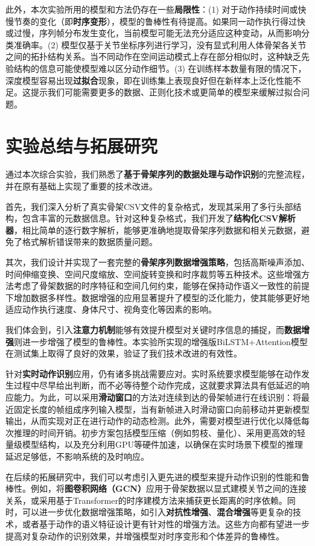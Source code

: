 \documentclass[UTF8]{article}
\begin{document}
此外，本次实验所用的模型和方法仍存在一些\textbf{局限性}：(1) 对于动作持续时间或快慢节奏的变化（即\textbf{时序变形}），模型的鲁棒性有待提高。如果同一动作执行得过快或过慢，序列帧分布发生变化，当前模型可能无法充分适应这种变动，从而影响分类准确率。(2) 模型仅基于关节坐标序列进行学习，没有显式利用人体骨架各关节之间的拓扑结构关系。当不同动作在空间运动模式上存在部分相似时，这种缺乏先验结构的信息可能使模型难以区分动作细节。(3) 在训练样本数量有限的情况下，深度模型容易出现\textbf{过拟合}现象，即在训练集上表现良好但在新样本上泛化性能不足。这提示我们可能需要更多的数据、正则化技术或更简单的模型来缓解过拟合问题。

\section{实验总结与拓展研究}

通过本次综合实验，我们熟悉了\textbf{基于骨架序列的数据处理与动作识别}的完整流程，并在原有基础上实现了重要的技术改进。

首先，我们深入分析了真实骨架CSV文件的复杂格式，发现其采用了多行头部结构，包含丰富的元数据信息。针对这种复杂格式，我们开发了\textbf{结构化CSV解析器}，相比简单的逐行数字解析，能够更准确地提取骨架序列数据和相关元数据，避免了格式解析错误带来的数据质量问题。

其次，我们设计并实现了一套完整的\textbf{骨架序列数据增强策略}，包括高斯噪声添加、时间伸缩变换、空间尺度缩放、空间旋转变换和时序裁剪等五种技术。这些增强方法考虑了骨架数据的时序特征和空间几何约束，能够在保持动作语义一致性的前提下增加数据多样性。数据增强的应用显著提升了模型的泛化能力，使其能够更好地适应动作执行速度、身体尺寸、视角变化等因素的影响。

我们体会到，引入\textbf{注意力机制}能够有效提升模型对关键时序信息的捕捉，而\textbf{数据增强}则进一步增强了模型的鲁棒性。本实验所实现的增强版BiLSTM+Attention模型在测试集上取得了良好的效果，验证了我们技术改进的有效性。

针对\textbf{实时动作识别}应用，仍有诸多挑战需要应对。实时系统要求模型能够在动作发生过程中尽早给出判断，而不必等待整个动作完成，这就要求算法具有低延迟的响应能力。为此，可以采用\textbf{滑动窗口}的方法对连续到达的骨架帧进行在线识别：将最近固定长度的帧组成序列输入模型，当有新帧进入时滑动窗口向前移动并更新模型输出，从而实现对正在进行动作的动态检测。此外，需要对模型进行优化以降低每次推理的时间开销。初步方案包括模型压缩（例如剪枝、量化）、采用更高效的轻量级模型结构，以及充分利用GPU等硬件加速，以确保在实时场景下模型的推理延迟足够低，不影响系统的及时响应。

在后续的拓展研究中，我们可以考虑引入更先进的模型来提升动作识别的性能和鲁棒性。例如，将\textbf{图卷积网络（GCN）}应用于骨架数据以显式建模关节之间的连接关系，或采用基于Transformer的时序建模方法来捕获更长距离的时序依赖。同时，可以进一步优化数据增强策略，如引入\textbf{对抗性增强}、\textbf{混合增强}等更复杂的技术，或者基于动作的语义特征设计更有针对性的增强方法。这些方向都有望进一步提高对复杂动作的识别效果，并增强模型对时序变形和个体差异的鲁棒性。
\end{document}
